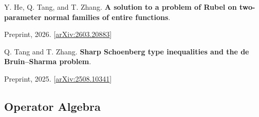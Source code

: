 \documentclass[11pt,letterpaper]{article}
\begin{document}
\begin{enumerate}[label={[\arabic*]},series=preprints]
\item \begin{minipage}[t]{\linewidth}\raggedright Y. He, Q. Tang, and T. Zhang. \textbf{A solution to a problem of Rubel on two-parameter normal families of entire functions}.\par Preprint, 2026. [\href{https://arxiv.org/abs/2603.20883}{arXiv:2603.20883}]\end{minipage}

\item \begin{minipage}[t]{\linewidth}\raggedright Q. Tang and T. Zhang. \textbf{Sharp Schoenberg type inequalities and the de Bruin--Sharma problem}.\par Preprint, 2025. [\href{https://arxiv.org/abs/2508.10341}{arXiv:2508.10341}]\end{minipage}

\end{enumerate}

\subsection{Operator Algebra}
\end{document}
